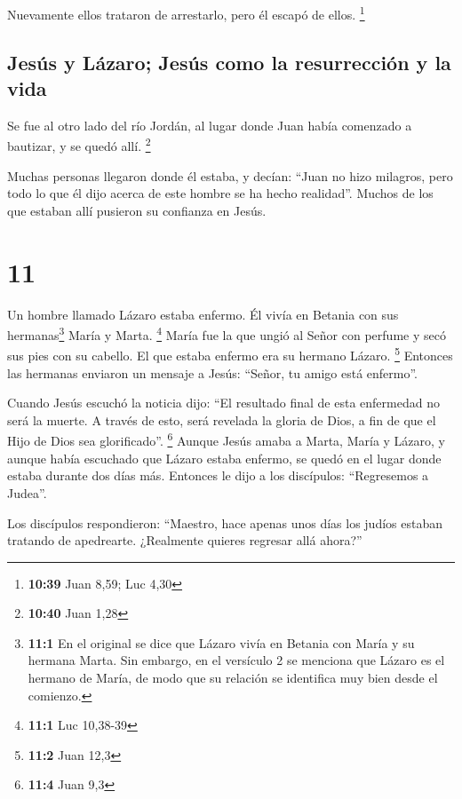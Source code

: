  Nuevamente ellos trataron de arrestarlo, pero él escapó
de ellos. \footnote{\textbf{10:39} Juan 8,59; Luc 4,30}

\hypertarget{jesuxfas-y-luxe1zaro-jesuxfas-como-la-resurrecciuxf3n-y-la-vida}{%
\subsection{Jesús y Lázaro; Jesús como la resurrección y la
vida}\label{jesuxfas-y-luxe1zaro-jesuxfas-como-la-resurrecciuxf3n-y-la-vida}}

 Se fue al otro lado del río Jordán, al lugar donde Juan
había comenzado a bautizar, y se quedó allí. \footnote{\textbf{10:40}
  Juan 1,28}

 Muchas personas llegaron donde él estaba, y decían:
``Juan no hizo milagros, pero todo lo que él dijo acerca de este hombre
se ha hecho realidad''.  Muchos de los que estaban allí
pusieron su confianza en Jesús.

\hypertarget{section-10}{%
\section{11}\label{section-10}}

 Un hombre llamado Lázaro estaba enfermo. Él vivía en
Betania con sus hermanas\footnote{\textbf{11:1} En el original se dice
  que Lázaro vivía en Betania con María y su hermana Marta. Sin embargo,
  en el versículo 2 se menciona que Lázaro es el hermano de María, de
  modo que su relación se identifica muy bien desde el comienzo.} María
y Marta. \footnote{\textbf{11:1} Luc 10,38-39}  María fue
la que ungió al Señor con perfume y secó sus pies con su cabello. El que
estaba enfermo era su hermano Lázaro. \footnote{\textbf{11:2} Juan 12,3}
 Entonces las hermanas enviaron un mensaje a Jesús:
``Señor, tu amigo está enfermo''.

 Cuando Jesús escuchó la noticia dijo: ``El resultado
final de esta enfermedad no será la muerte. A través de esto, será
revelada la gloria de Dios, a fin de que el Hijo de Dios sea
glorificado''. \footnote{\textbf{11:4} Juan 9,3}  Aunque
Jesús amaba a Marta, María y Lázaro,  y aunque había
escuchado que Lázaro estaba enfermo, se quedó en el lugar donde estaba
durante dos días más.  Entonces le dijo a los discípulos:
``Regresemos a Judea''.

 Los discípulos respondieron: ``Maestro, hace apenas unos
días los judíos estaban tratando de apedrearte. ¿Realmente quieres
regresar allá ahora?''

